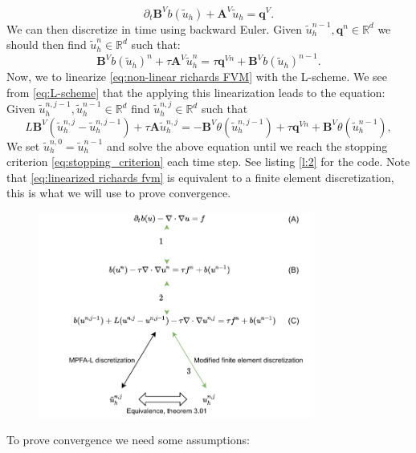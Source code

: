 \documentclass[../Main/main.tex]{subfiles}
\begin{document}
	\begin{equation}
		\partial_t\pmb{B}^{V} b(\tilde{u}_h) + \pmb{A}^V \tilde{u}_h = \pmb{q}^V. 
	\end{equation}
	We can then discretize in time using backward Euler. Given $ \tilde{u}_h^{n-1},\pmb{q}^n \in \mathbb{R}^d$ we should then find $ \tilde{u}_h^n \in \mathbb{R}^d$ such that: 
	\begin{equation} \label{eq:non-linear richards FVM}
		\pmb{B}^V  b(\tilde{u}_h)^n + \tau \pmb{A}^V \tilde{u}_h^n = \tau \pmb{q}^{Vn} + \pmb{B}^V  b(\tilde{u}_h)^{n-1}.
	\end{equation}
	Now, we to linearize \eqref{eq:non-linear richards FVM} with the L-scheme. We see from \eqref{eq:L-scheme} that the applying this linearization leads to the equation: Given $\tilde{u}^{n,j-1}_h, \tilde{u}^{n-1}_h \in \mathbb{R}^d$ find $\tilde{u}^{n,j}_h \in \mathbb{R}^d$ such that
	\begin{equation}\label{eq:linearized richards fvm}
		L\pmb{B}^V(\tilde{u}^{n,j}_h-\tilde{u}^{n,j-1}_h) + \tau \pmb{A} \tilde{u}_h^{n,j} = -\pmb{B}^V \theta (\tilde{u}_h^{n,j-1})  + \tau \pmb{q}^{Vn} +  \pmb{B}^V \theta (\tilde{u}_h^{n-1}),
	\end{equation}
	We set $\tilde{u}^{n,0}_h=\tilde{u}^{n-1}_h$ and solve the above equation until we reach the stopping criterion \eqref{eq:stopping_criterion} each time step. See listing \ref{l:2} for the code. Note that \eqref{eq:linearized richards fvm} is equivalent to a finite element discretization, this is what we will use to prove convergence. 
	\begin{figure}[H]
		\centering
		\includegraphics[width=0.8\textwidth]{convergence schema.pdf}
		\caption{}
		\label{fig:convergence schema}
	\end{figure}
	To prove convergence we need some assumptions:
\end{document}
